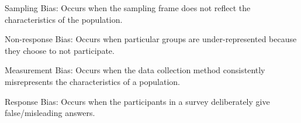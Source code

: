     \begin{definition}
        Sampling Bias: Occurs when the sampling frame does not reflect the characteristics of the population.
    \end{definition}
    \begin{definition}
        Non-response Bias: Occurs when particular groups are under-represented because they choose to not participate.   
    \end{definition}
    \begin{definition}
        Measurement Bias: Occurs when the data collection method consistently misrepresents the characteristics of a population.    
    \end{definition}
    \begin{definition}
        Response Bias: Occurs when the participants in a survey deliberately give false/misleading answers.
    \end{definition}